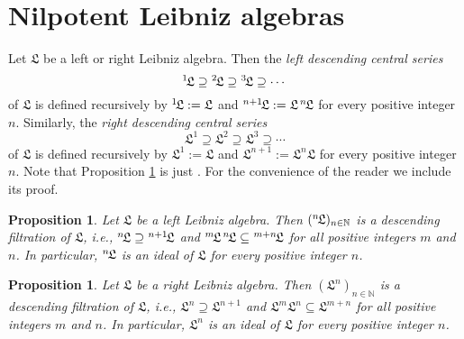 \documentclass{amsart}
\newtheorem{pro}[thm]{Proposition}
\numberwithin{equation}{section}
\newcommand{\N}{\mathbb{N}}
\newcommand{\lf}{\mathfrak{L}}
\begin{document}

\section{Nilpotent Leibniz algebras}


Let $\lf$ be a left or right Leibniz algebra. Then the {\it left descending central series\/} $$^1\hspace{-.5mm}
\lf\supseteq\hspace{.1mm}^2\hspace{-.5mm}\lf\supseteq\hspace{.1mm}^3\hspace{-.5mm}\lf
\supseteq\cdots$$ of $\lf$ is defined recursively by $^1\hspace{-.5mm}\lf:=\lf$ and $^{n+1}
\hspace{-.5mm}\lf:=\lf\hspace{.5mm}^n\hspace{-.5mm}\lf$ for every positive integer $n$.
Similarly, the {\it right descending central series\/} $$\lf^1\supseteq\lf^2\supseteq\lf^3\supseteq
\cdots$$ of $\lf$ is defined recursively by $\lf^1:=\lf$ and $\lf^{n+1}:=\lf^n\lf$ for every
positive integer $n$. Note that Proposition \ref{rightlowcenser} is just \cite[Lemma 1]{AO1}.
For the convenience of the reader we include its proof.

\begin{pro}\label{leftlowcenser}
Let $\lf$ be a left Leibniz algebra. Then $(^n\hspace{-.5mm}\lf)_{n\in\N}$ is a descending filtration
of $\lf$, i.e., $^n\hspace{-.5mm}\lf\supseteq\hspace{.1mm}^{n+1}\hspace{-.5mm}\lf$ and
$^m\hspace{-.5mm}\lf\hspace{.5mm}^n\hspace{-.5mm}\lf\subseteq\hspace{.1mm}^{m+n}
\hspace{-.5mm}\lf$ for all positive integers $m$ and $n$. In particular, $^n\hspace{-.5mm}\lf$
is an ideal of $\lf$ for every positive integer $n$.
\end{pro}

\begin{pro}\label{rightlowcenser}
Let $\lf$ be a right Leibniz algebra. Then $(\lf^n)_{n\in\N}$ is a descending filtration of $\lf$,
i.e., $\lf^n\supseteq\lf^{n+1}$ and $\lf^m\lf^n\subseteq\lf^{m+n}$ for all positive integers
$m$ and $n$. In particular, $\lf^n$ is an ideal of $\lf$ for every positive integer $n$.
\end{pro}
\end{document}
